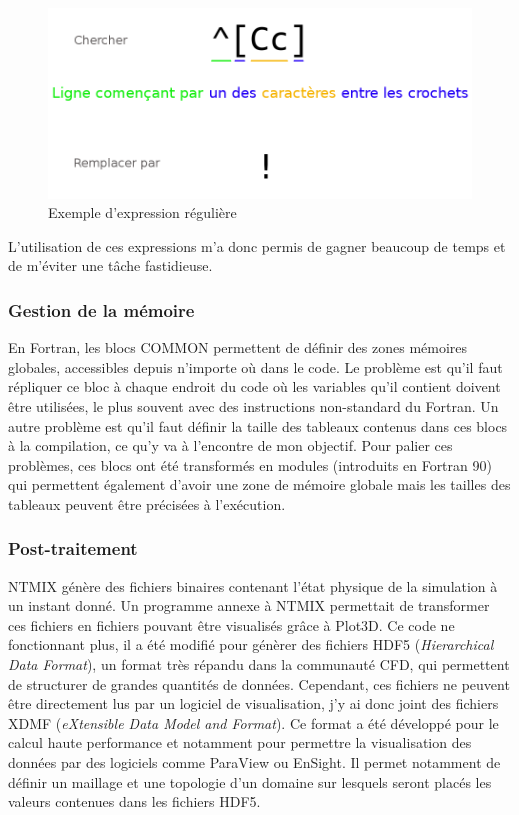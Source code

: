 \begin{figure}[ht]
  \centering
  \includegraphics[scale=0.3]{figures/regex.png}
  \caption{\label{fig:regex}Exemple d'expression régulière}
\end{figure}


L'utilisation de ces expressions m'a donc permis de gagner beaucoup de temps et de m'éviter une tâche fastidieuse.

\subsubsection{Gestion de la mémoire}En Fortran, les blocs COMMON permettent de définir des zones mémoires globales, accessibles depuis n'importe où dans le code. Le problème est qu'il faut répliquer ce bloc à chaque endroit du code où les variables qu'il contient doivent être utilisées, le plus souvent avec des instructions non-standard du Fortran. Un autre problème est qu'il faut définir la taille des tableaux contenus dans ces blocs à la compilation, ce qu'y va à l'encontre de mon objectif. Pour palier ces problèmes, ces blocs ont été transformés en modules (introduits en Fortran 90) qui permettent également d'avoir une zone de mémoire globale mais les tailles des tableaux peuvent être précisées à l'exécution.

\subsubsection{Post-traitement}NTMIX génère des fichiers binaires contenant l'état physique de la simulation à un instant donné. Un programme annexe à NTMIX permettait de transformer ces fichiers en fichiers pouvant être visualisés grâce à Plot3D. Ce code ne fonctionnant plus, il a été modifié pour génèrer des fichiers HDF5 (\textit{Hierarchical Data Format}), un format très répandu dans la communauté CFD, qui permettent de structurer de grandes quantités de données. Cependant, ces fichiers ne peuvent être directement lus par un logiciel de visualisation, j'y ai donc joint des fichiers XDMF (\textit{eXtensible Data Model and Format}). Ce format a été développé pour le calcul haute performance et notamment pour permettre la visualisation des données par des logiciels comme ParaView ou EnSight. Il permet notamment de définir un maillage et une topologie d'un domaine sur lesquels seront placés les valeurs contenues dans les fichiers HDF5.


